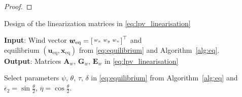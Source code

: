 \begin{proof}
%
\end{proof}

\begin{algorithm}
     \caption{Design of the linearization matrices in \eqref{eq:lpv_linearisation}}\label{alg:linea}
      \hspace*{.1cm} \textbf{Input}: Wind vector $\boldsymbol{w}_{\text{eq}} =\left[ \begin{smallmatrix}w_x & w_y & w_z \end{smallmatrix} \right]^\top$ and\\
      \hspace*{1.2cm} equilibrium $(\boldsymbol{u}_{\text{eq}}, \boldsymbol{x}_{\text{eq}})$ from \eqref{eq:equilibrium} and Algorithm~\ref{alg:eq}.\\
 \hspace*{.1cm} \textbf{Output}: 
 Matrices $\boldsymbol{A}_{w}$, $\boldsymbol{G}_{w}$, $\boldsymbol{E}_{w}$ in \eqref{eq:lpv_linearisation}

 \begin{algorithmic}[1]

\State Select parameters $\psi$, $\theta$, $\tau$, $\delta$ in \eqref{eq:equilibrium} from Algorithm~\ref{alg:eq} and  $\overline \epsilon_{2} = \sin{\frac{\theta}{2}}$, $\overline \eta =  \cos{\frac{\theta}{2}}$.


\end{algorithmic}
\end{algorithm}
